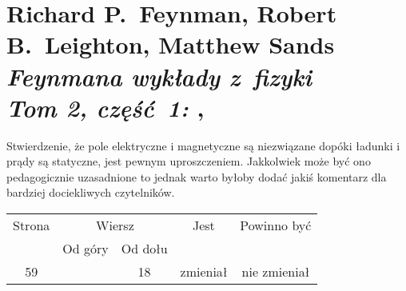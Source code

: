 \documentclass[a4paper,11pt]{article}
\numberwithin{equation}{section}
\begin{document}
\VerSpaceTwo










\newpage

\section{Richard P.~Feynman, Robert B.~Leighton, Matthew
  Sands \\
  \textit{Feynmana wykłady z~fizyki} \\
  \textit{Tom 2, część~1: }, \cite{}}


\vspace{0em}



\vspace{0em}


\noindent
{} Stwierdzenie, że pole elektryczne i magnetyczne są niezwiązane
dopóki ładunki i prądy są statyczne, jest pewnym uproszczeniem. Jakkolwiek
może być ono pedagogicznie uzasadnione to jednak warto byłoby dodać jakiś
komentarz dla bardziej dociekliwych czytelników.







\begin{center}

  \begin{tabular}{|c|c|c|c|c|}
    \hline
    Strona & \multicolumn{2}{c|}{Wiersz} & Jest
                              & Powinno być \\ \cline{2-3}
    & Od góry & Od dołu & & \\
    \hline
    59 & & 18 & zmieniał & nie zmieniał \\
    \hline
  \end{tabular}

\end{center}

\VerSpaceTwo














\printbibliography





\end{document}

